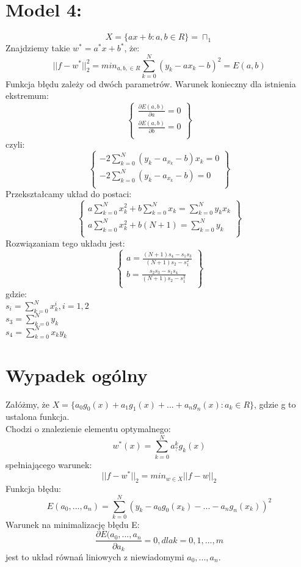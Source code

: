 \documentclass[12pt]{article}
\begin{document}
\section*{Model 4:}
$$ X = \{ax + b: a,b \in R\} = \sqcap_1$$
Znajdziemy takie $w^{*}=a^{*}x +b^{*}$, że:
$$||f-w^{*}||_2^2 = min_{a,b,\in R} \sum_{k=0}^{N} (y_k - ax_k -b)^2=E(a,b)$$
Funkcja błędu zależy od dwóch parametrów. Warunek konieczny dla istnienia ekstremum:
   \[
    \left\{\begin{array}{lr}
        \frac{\partial E(a,b)}{\partial a} = 0 \\
       \frac{\partial E(a,b)}{\partial b} = 0  \\
        \end{array}\right\} 
  \]
  czyli:
 \[
    \left\{\begin{array}{lr}
        -2\sum_{k=0}^{N}(y_k -a_{x_k} -b)x_k = 0 \\
       -2\sum_{k=0}^{N}(y_k -a_{x_k} -b) = 0 \\
        \end{array}\right\} 
  \]
Przekształcamy układ do postaci:
 \[
    \left\{\begin{array}{lr}
        a\sum_{k=0}^{N}x_k^2 + b\sum_{k=0}^{N}x_k =\sum_{k=0}^{N}y_k x_k  \\
       a\sum_{k=0}^{N}x_k^2 + b(N+1) =\sum_{k=0}^{N}y_k\\
        \end{array}\right\} 
  \]
Rozwiązaniam tego układu jest:
 \[
    \left\{\begin{array}{lr}
        a=\frac{(N+1)s_4 -s_1s_3}{(N+1)s_2 -s_1^2} \\
       b= \frac{s_2s_3 - s_1s_4}{(N+1)s_2 -s_1^2}\\
        \end{array}\right\} 
  \]
 gdzie:\\
 $s_i = \sum_{k=0}^{N}x_k^i, i=1,2$\\
 $s_3 = \sum_{k=0}^{N}y_k$\\
 $s_4 = \sum_{k=0}^{N}x_ky_k$\\
 \newpage
 \section*{Wypadek ogólny}
 Załóżmy, że $X=\{a_0g_0(x) + a_1g_1(x)+ ... +a_ng_n(x): a_k \in R\}$, gdzie g to ustalona funkcja.\\
 Chodzi o znalezienie elementu optymalnego:
 $$w^{*}(x) = \sum_{k=0}^{N}a_{?}^kg_k(x)$$
 spełniającego warunek:
 $$||f-w^{*}||_2 = min_{w \in X} ||f-w||_2$$
 Funkcja błędu:
 $$E(a_0,...,a_n) = \sum_{k=0}^{N}(y_k - a_0g_0(x_k)-...-a_ng_n(x_k))^2$$
Warunek na minimalizację błędu E:
$$\frac{\partial E(a_0,...,a_n}{\partial a_k}=0, dla k=0,1,...,m$$
jest to układ równań liniowych z niewiadomymi $a_0,...,a_n$.




\setcounter{page}{2}
\end{document}
